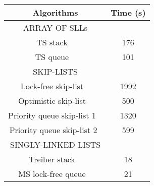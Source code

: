 %
%
%
%
%
%



\begin{figure}[]
\center
\footnotesize


\begin{tabular}{|c | c | }
  \hline
   \textsf{{\textbf{Algorithms}}} &  \textsf{{\textbf{Time (s)}}} \\
\hline
\textsf{{{ARRAY OF SLLs}}} & \\
\hline
\textsf{TS stack  ~\cite{ts-stack}}\;\;\;\;\;\;  & \textsf{176} \\
\textsf{TS queue  ~\cite{ts-stack}}& \textsf{101} \\
\hline
 \textsf{{{SKIP-LISTS}}} &   \\
\hline
\;\;\;\;\textsf{Lock-free skip-list   ~\cite{ArtOfMpP}}\;\;\;\;\;\;  & \textsf{1992} \\

\textsf{Optimistic skip-list ~\cite{MS:QueueAlgorithms}}& \textsf{500} \\
 
\textsf{Priority queue skip-list 1 ~\cite{priority-queue-skiplist}}  &  \textsf{1320} \\

\textsf{Priority queue skip-list 2~\cite{jonatan:priorityqueue}}  &  \textsf{599} \\
\hline
   \textsf{{{SINGLY-LINKED LISTS}}} &   \\
\hline
\textsf{Treiber stack  ~\cite{Treiber:stack}}\;\;\;\;\;\; & \textsf {18} \\

\textsf{MS lock-free queue  ~\cite{MS:QueueAlgorithms}}& \textsf{21} \\


\end{tabular}
\end{figure}
